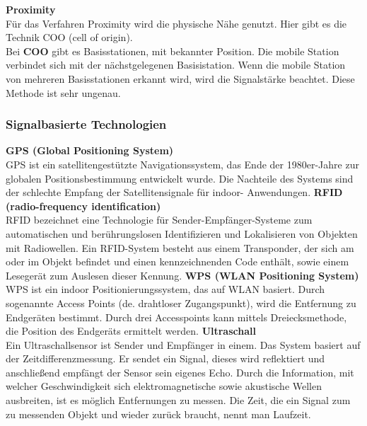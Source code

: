     \textbf{Proximity}\\
    Für das Verfahren Proximity wird die physische Nähe genutzt.
    Hier gibt es die Technik COO (cell of origin). \\
    Bei \textbf{COO} gibt es Basisstationen, mit bekannter Position. Die mobile Station verbindet sich mit der nächstgelegenen Basisistation. Wenn die mobile Station von mehreren Basisstationen erkannt wird, wird die Signalstärke beachtet. Diese Methode ist sehr ungenau.
    \\ %

    \subsubsection{Signalbasierte Technologien}
    \textbf{GPS (Global Positioning System)}\\
    GPS ist ein satellitengestützte Navigationssystem, das Ende der 1980er-Jahre zur globalen Positionsbestimmung entwickelt wurde. Die Nachteile des Systems sind der schlechte Empfang der Satellitensignale für indoor- Anwendungen. 
    \textbf{RFID (radio-frequency identification)}\\
    RFID bezeichnet eine Technologie für Sender-Empfänger-Systeme zum automatischen und berührungslosen Identifizieren und Lokalisieren von Objekten mit Radiowellen. Ein RFID-System besteht aus einem Transponder, der sich am oder im Objekt befindet und einen kennzeichnenden Code enthält, sowie einem Lesegerät zum Auslesen dieser Kennung. 
    \textbf{WPS (WLAN Positioning System)}\\    
    WPS ist ein indoor Positionierungssystem, das auf WLAN basiert. Durch sogenannte  Access Points (de. drahtloser Zugangspunkt), wird die Entfernung zu Endgeräten bestimmt. Durch drei Accesspoints kann mittels Dreiecksmethode, die Position des Endgeräts ermittelt werden.
    \textbf{Ultraschall}\\
    Ein Ultraschallsensor ist Sender und Empfänger in einem. Das System basiert auf der Zeitdifferenzmessung. Er sendet ein Signal, dieses wird reflektiert und anschließend empfängt der Sensor sein eigenes Echo.
    Durch die Information, mit welcher Geschwindigkeit sich elektromagnetische sowie akustische Wellen ausbreiten, ist es möglich Entfernungen zu messen. Die Zeit, die ein Signal zum zu messenden Objekt und wieder zurück braucht, nennt man Laufzeit.

